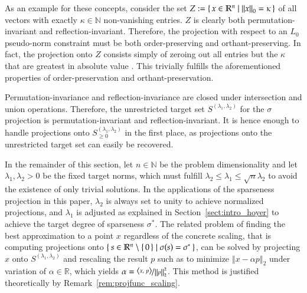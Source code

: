 \documentclass[twoside,11pt]{article}
\newcommand{\N}{\mathbb{N}}
\newcommand{\R}{\mathbb{R}}
\newcommand{\0}{\mathcal{O}}
\newcommand{\norm}[1]{\left\Vert#1\right\Vert}
\newcommand{\scp}[2]{\left<#1,\ #2\right>}
\begin{document}
As an example for these concepts, consider the set $Z := \set{x\in\R^n | \norm{x}_0 = \kappa}$ of all vectors with exactly $\kappa\in\N$ non-vanishing entries.
$Z$ is clearly both permutation-invariant and reflection-invariant.
Therefore, the projection with respect to an $L_0$ pseudo-norm constraint must be both order-preserving and orthant-preserving.
In fact, the projection onto $Z$ consists simply of zeroing out all entries but the $\kappa$ that are greatest in absolute value \citep{Blumensath2009}.
This trivially fulfills the aforementioned properties of order-preservation and orthant-preservation.

Permutation-invariance and reflection-invariance are closed under intersection and union operations.
Therefore, the unrestricted target set $S^{(\lambda_1,\lambda_2)}$ for the $\sigma$ projection is permutation-invariant and reflection-invariant.
It is hence enough to handle projections onto $S_{\geq 0}^{(\lambda_1,\lambda_2)}$ in the first place, as projections onto the unrestricted target set can easily be recovered.

In the remainder of this section, let $n\in\N$ be the problem dimensionality and let $\lambda_1,\lambda_2>0$ be the fixed target norms, which must fulfill $\lambda_2 \leq \lambda_1 \leq \sqrt{n}\lambda_2$ to avoid the existence of only trivial solutions.
In the applications of the sparseness projection in this paper, $\lambda_2$ is always set to unity to achieve normalized projections, and $\lambda_1$ is adjusted as explained in Section~\ref{sect:intro_hoyer} to achieve the target degree of sparseness $\sigma^*$.
The related problem of finding the best approximation to a point $x$ regardless of the concrete scaling, that is computing projections onto $\Set{s\in\R^n\setminus\set{0} | \sigma(s) = \sigma^*}$, can be solved by projecting $x$ onto $S^{(\lambda_1,\lambda_2)}$ and rescaling the result $p$ such as to minimize $\norm{x - \alpha p}_2$ under variation of $\alpha\in\R$, which yields $\alpha = \nicefrac{\scp{x}{p}}{\norm{p}_2^2}$.
This method is justified theoretically by Remark~\ref{rem:projfunc_scaling}.
\end{document}
